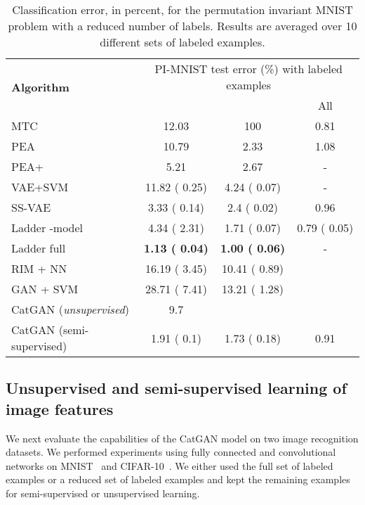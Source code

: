 \documentclass{article} \usepackage{iclr2016_conference,times}
\begin{document}
\begin{table}[t]
  \begin{tabular}{lccc}
    \multirow{2}{*}{\bf Algorithm} & \multicolumn{3}{c}{PI-MNIST
                                     test error (\%) with  labeled examples} \\
    &  &  & All  \\
    \hline
    MTC \citep{Rifai_2011} & 12.03 & 100 & 0.81 \\
    PEA \citep{Bachman_NIPS2014} & 10.79 & 2.33 & 1.08 \\
    PEA+ \citep{Bachman_NIPS2014} & 5.21 & 2.67 & -  \\
    VAE+SVM \citep{Kingma_NIPS2014} & 11.82 ( 0.25) & 4.24 ( 0.07) & - \\
    SS-VAE \citep{Kingma_NIPS2014} & 3.33 ( 0.14) & 2.4 ( 0.02) & 0.96
    \\
    Ladder -model \citep{Rasmus_NIPS2015} & 4.34 ( 2.31) & 1.71 ( 0.07) & 0.79 ( 0.05) \\
    Ladder full \citep{Rasmus_NIPS2015} & \textbf{1.13 ( 0.04)} & \textbf{1.00 ( 0.06)} & - \\
    \hline
    RIM + NN & 16.19 ( 3.45)  & 10.41 ( 0.89) \\ 
    GAN + SVM & 28.71 ( 7.41) & 13.21 ( 1.28) \\
    CatGAN (\emph{unsupervised}) & 9.7 & &  \\
    CatGAN (semi-supervised) & 1.91 ( 0.1) & 1.73 ( 0.18) & 0.91  \\  \end{tabular}
  \caption{Classification error, in percent, for the permutation invariant MNIST problem with a reduced number of labels. Results are averaged over 10 different sets of labeled examples.}
  \label{tab:pi_mnist}
\end{table}

\subsection{Unsupervised  and semi-supervised learning of image features}
We next evaluate the capabilities of the CatGAN model on two
image recognition datasets. We performed
experiments using fully connected and convolutional
networks on MNIST~\citep{LeCun_NC1989} and CIFAR-10~\citep{Krizhevsky2009}. We either used the full set of
labeled examples or a reduced set of labeled examples and kept
the remaining examples for semi-supervised or unsupervised learning.
\end{document}
